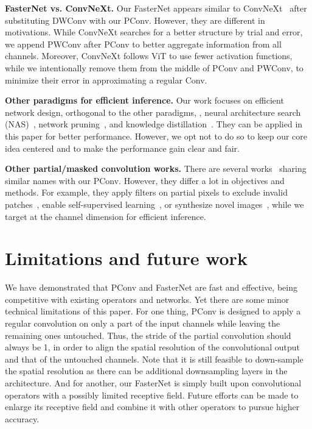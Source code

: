 \medskip\noindent\textbf{FasterNet vs. ConvNeXt.} \enspace 
Our FasterNet appears similar to ConvNeXt~\cite{liu2022convnet} after substituting DWConv with our PConv. However, they are different in motivations. While ConvNeXt searches for a better structure by trial and error, we append PWConv after PConv to better aggregate information from all channels. Moreover, ConvNeXt follows ViT to use fewer activation functions, while we intentionally remove them from the middle of PConv and PWConv, to minimize their error in approximating a regular Conv. 

\medskip\noindent\textbf{Other paradigms for efficient inference.} \enspace 
Our work focuses on efficient network design, orthogonal to the other paradigms, \eg, neural architecture search (NAS)~\cite{elsken2019neural}, network pruning~\cite{molchanov2016pruning}, and knowledge distillation~\cite{hinton2015distilling}. They can be applied in this paper for better performance. However, we opt not to do so to keep our core idea centered and to make the performance gain clear and fair.

\medskip\noindent\textbf{Other partial/masked convolution works.} \enspace 
There are several works~\cite{liu2018image,gao2022convmae,liu2022partial} sharing similar names with our PConv. However, they differ a lot in objectives and methods. For example, they apply filters on partial pixels to exclude invalid patches~\cite{liu2018image}, enable self-supervised learning~\cite{gao2022convmae}, or synthesize novel images~\cite{liu2022partial}, while we target at the channel dimension for efficient inference. 

\section{Limitations and future work}
We have demonstrated that PConv and FasterNet are fast and effective, being competitive with existing operators and networks. Yet there are some minor technical limitations of this paper. For one thing, PConv is designed to apply a regular convolution on only a part of the input channels while leaving the remaining ones untouched. Thus, the stride of the partial convolution should always be 1, in order to align the spatial resolution of the convolutional output and that of the untouched channels. Note that it is still feasible to down-sample the spatial resolution as there can be additional downsampling layers in the architecture. 
And for another, our FasterNet is simply built upon convolutional operators with a possibly limited receptive field. Future efforts can be made to enlarge its receptive field and combine it with other operators to pursue higher accuracy.





% 
% 
% 